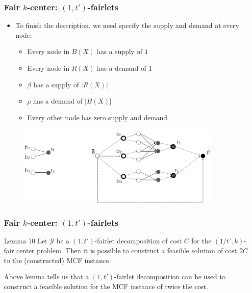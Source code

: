 \documentclass{beamer}
\begin{document}
\begin{frame}
\frametitle{Fair $k$-center: $(1, t')$-fairlets}

\begin{itemize}
	\item To finish the description, we need specify the supply and demand at every node:
	\begin{itemize}
		\item Every node in $B(X)$ has a supply of $1$
		\item Every node in $R(X)$ has a demand of $1$
		\item $\beta$ has a supply of $|R(X)|$
		\item $\rho$ has a demand of $|B(X)|$
		\item Every other node has zero supply and demand
	\end{itemize}
\end{itemize} \pause

\begin{figure}[hbt]
  \includegraphics[height=4cm]{fig3.png}
\end{figure}

\end{frame}



\begin{frame}
\frametitle{Fair $k$-center: $(1, t')$-fairlets}

\begin{block}{Lemma 10}
Let $\mathcal{Y}$ be a $(1, t')$-fairlet decomposition of cost $C$ for the $(1/t', k)$-fair center problem. Then it is possible to construct a feasible solution of cost $2C$ to the (constructed) MCF instance.

\end{block}

Above lemma tells us that a $(1, t')$-fairlet decomposition can be used to construct a feasible solution for the MCF instance of twice the cost.

\end{frame}
\end{document}
